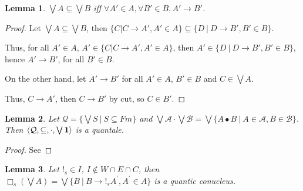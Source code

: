 \documentclass[a4paper]{article}
\newtheorem{lemma}{Lemma}
\begin{document}
\begin{lemma}
  $\bigvee A \subseteq \bigvee B$ iff $\forall A' \in A, \forall B' \in B, A' \rightarrow B'$.
\end{lemma}

\begin{proof}
  Let $\bigvee A \subseteq \bigvee B$,
  then $\{ C | C \rightarrow A', A' \in A \} \subseteq \{ D \: | \: D \rightarrow B', B' \in B \}$.

Thus, for all $A' \in A$, $A' \in \{ C | C \rightarrow A', A' \in A \}$,
then $A' \in \{ D \: | \: D \rightarrow B', B' \in B \}$, hence $A' \rightarrow B'$, for all $B' \in B$.

On the other hand, let $A' \rightarrow B'$ for all $A' \in A$, $B' \in B$ and $C \in \bigvee A$.

Thus, $C \rightarrow A'$, then $C \rightarrow B'$ by cut, so $C \in B'$.

\end{proof}

\begin{lemma}
  Let $\mathcal{Q} = \{ \bigvee S \: | \: S \subseteq Fm \}$ and $\bigvee \mathcal{A} \cdot \bigvee \mathcal{B} =
  \bigvee \{ A \bullet B \: | \: A \in \mathcal{A}, B \in \mathcal{B} \}$.
  Then $\langle \mathcal{Q}, \subseteq, \cdot, \bigvee{{\bf 1}}\rangle$ is a quantale.
\end{lemma}

\begin{proof}
  See
\end{proof}

\begin{lemma}
  Let $!_s \in I$, $I \notin W \cap E \cap C$,
  then $\Box_s (\bigvee A) = \bigvee \{ B \: | \: B \rightarrow !_s A^{'}, A^{'} \in A \}$
  is a quantic conucleus.
\end{lemma}
\end{document}
